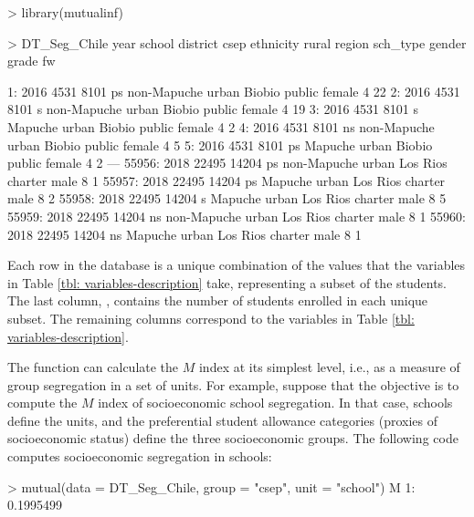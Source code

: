 \begin{example}
> library(mutualinf)
\end{example}
\vfill
\begin{example}
> DT_Seg_Chile
       year school district csep   ethnicity rural   region sch_type gender grade fw

    1: 2016   4531     8101   ps non-Mapuche urban   Biobio   public female     4 22
    2: 2016   4531     8101    s non-Mapuche urban   Biobio   public female     4 19
    3: 2016   4531     8101    s     Mapuche urban   Biobio   public female     4  2
    4: 2016   4531     8101   ns non-Mapuche urban   Biobio   public female     4  5
    5: 2016   4531     8101   ps     Mapuche urban   Biobio   public female     4  2
   ---                                                                                              
55956: 2018  22495    14204   ps non-Mapuche urban Los Rios  charter   male     8  1
55957: 2018  22495    14204   ps     Mapuche urban Los Rios  charter   male     8  2
55958: 2018  22495    14204    s     Mapuche urban Los Rios  charter   male     8  5
55959: 2018  22495    14204   ns non-Mapuche urban Los Rios  charter   male     8  1
55960: 2018  22495    14204   ns     Mapuche urban Los Rios  charter   male     8  1
\end{example}

Each row in the database is a unique combination of the values that the variables in Table \ref{tbl: variables-description} take, representing a subset of the students.
The last column, , contains the number of students enrolled in each unique subset. The remaining columns correspond to the variables in Table \ref{tbl: variables-description}.

The  function can calculate the $M$ index at its simplest level, i.e., as a measure of group segregation in a set of units.  For example, suppose that the objective is to compute the $M$ index of socioeconomic school segregation. In that case, schools define the units, and the preferential student allowance categories (proxies of socioeconomic status) define the three socioeconomic groups. The following code computes socioeconomic segregation in schools:
\begin{example}
> mutual(data = DT_Seg_Chile,
         group = "csep",
         unit = "school")
           M
1: 0.1995499
\end{example}

